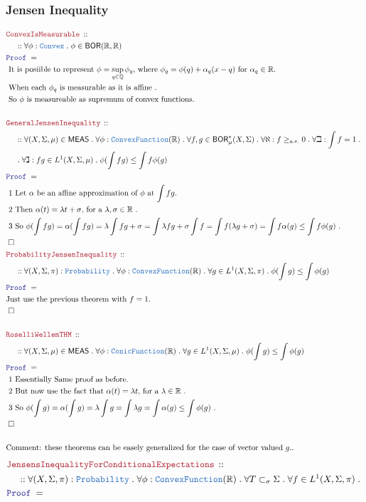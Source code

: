\documentclass[12pt]{scrartcl}
\newcommand{\TYPE}[1]{\textcolor{NavyBlue}{\mathtt{#1}}}
\newcommand{\LOGIC}[1]{\textcolor{Blue}{\mathtt{#1}}}
\newcommand{\THM}[1]{\textcolor{Maroon}{\mathtt{#1}}}
\renewcommand{\.}{\; . \;}
\newcommand{\Theorem}[2]{& \THM{#1} \, :: \, #2 \\ & \Proof = \\ }
\newcommand{\NewLine}{\\ & \kern 1pc}
\newcommand{\Page}[1]{ \begin{align*} #1 \end{align*}   }
\newcommand{\Reals}{\mathbb{R} }
\newcommand{\Rats}{\mathbb{Q} }
\newcommand{\QED}{\; \square}
\newcommand{\EndProof}{& \QED \\}
\newcommand{\Proof}{\LOGIC{Proof} \; }
\newcommand{\Explain}[1]{& \text{#1.} \\}
\newcommand{\BOR}{\mathsf{BOR}}
\renewcommand{\ae}{\mathrm{a.e.}}
\newcommand{\MEAS}{\mathsf{MEAS}}
\begin{document}
\subsubsection{Jensen Inequality}
\Page{
	\Theorem{ConvexIsMeasurable}
	{
		\NewLine ::
		\forall  \phi : \TYPE{Convex} \.
		\phi \in \BOR(\Reals,\Reals)
	}
	\Explain{
		It is posiible to represent $\phi = \sup_{q \in \Rats} \phi_q$,
		where $\phi_q = \phi(q) + \alpha_q(x-q)$ for $\alpha_q \in \Reals$}
	\Explain{
		When each $\phi_q$ is measurable as it is affine
	}
	\Explain{
		So $\phi$ is measureable as supremum of convex functions}
	\\	
	\Theorem{GeneralJensenInequality}
	{
		\NewLine ::		
		\forall (X,\Sigma,\mu) \in \MEAS \.
		\forall \phi : \TYPE{ConvexFunction}(\Reals) \.
		\forall f,g \in \BOR_\mu^*(X,\Sigma) \.
		\forall \aleph : f \ge_{\ae} 0 \.
		\forall \beth : \int f = 1 \. \NewLine \.
		\forall \gimel : fg  \in L^1(X,\Sigma,\mu) \. 
		\phi( \int  fg ) \le \int f \phi(g)
	}
	\Explain{
		1 Let $\alpha$ be an affine approximation of $\phi$ at $\int  fg $}
	\Explain{ 
		2 Then $\alpha(t) = \lambda t + \sigma$, for a $\lambda,\sigma \in \Reals$
	}
	\Explain{
		3 So $\phi(\int fg) = \alpha(\int fg) = \lambda \int fg   + \sigma =
			  \int \lambda fg   + \sigma \int f = \int f (\lambda g + \sigma)  = 
			 \int f \alpha(g) \le \int f \phi(g)$
	}
	\EndProof
	\Theorem{ProbabilityJensenInequality}
	{
		\NewLine ::		
		\forall (X,\Sigma,\pi) : \TYPE{Probability} \.
		\forall \phi : \TYPE{ConvexFunction}(\Reals) \.
		\forall g \in L^1(X,\Sigma,\pi) \.
		\phi( \int  g ) \le \int  \phi(g)
	}
	\Explain{Just use the previous theorem with $f=1$}
	\EndProof
	\\
	\Theorem{RoselliWellemTHM}
	{
		\NewLine ::		
		\forall (X,\Sigma,\mu) \in \MEAS \.
		\forall \phi : \TYPE{ConicFunction}(\Reals) \.
		\forall g  \in L^1(X,\Sigma,\mu) \.
		\phi( \int  g ) \le \int \phi(g)
	}
	\Explain{
		1 Essentially Same proof as before}
	\Explain{ 
		2 But now use the fact that $\alpha(t) = \lambda t$, for a $\lambda \in \Reals$
	}
	\Explain{
		3 So $\phi(\int g) = \alpha(\int g) = \lambda \int g  =
			 \int \lambda g  = \int  \alpha(g) \le \int \phi(g)$
	}
	\EndProof
	\\
	\Explain{Comment: these theorems can be easely generalized for the case of vector valued $g$.}
}\Page{
	\Theorem{JensensInequalityForConditionalExpectations}
	{
		\NewLine ::		
		\forall (X,\Sigma,\pi)  : \TYPE{Probability} \.
		\forall \phi : \TYPE{ConvexFunction}(\Reals) \.
		\forall T \subset_\sigma \Sigma \.		
		\forall f \in L^1(X,\Sigma,\pi) \.
}}
\end{document}
